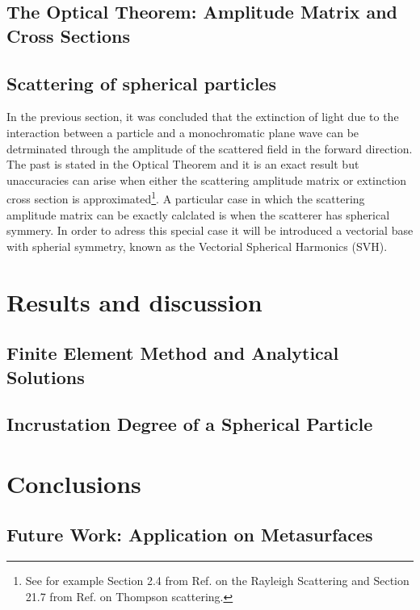 \documentclass[11pt]{Latex/Classes/PhDthesisPSnPDF}
\begin{document}
	\section{The Optical Theorem: Amplitude Matrix and Cross Sections}
	\label{section:AmpMatCrossSect}
	

	\section{Scattering of spherical particles}
	\label{section:Mie}

In the previous section, it was concluded that the extinction of light due to the interaction between a particle and a monochromatic plane wave can be detrminated through the amplitude of the scattered field in the forward direction. The past is stated in the Optical Theorem and it is an exact result but unaccuracies can arise when either the scattering amplitude matrix or extinction cross section is approximated\footnote{See for example Section 2.4 from Ref. \cite{tsang_scattering_2000} on the Rayleigh Scattering and Section 21.7 from Ref. \cite{zangwill_modern_2013} on Thompson scattering.}. A particular case in which the scattering amplitude matrix can be exactly calclated is when the scatterer has spherical symmery. In order to adress this special case it will be introduced a vectorial base with spherial symmetry, known as the Vectorial Spherical Harmonics (SVH).

	

\chapter{Results and discussion}
	\section{Finite Element Method and Analytical Solutions}
	\section{Incrustation Degree of a Spherical Particle}

\chapter{Conclusions}
    \section{Future Work: Application on Metasurfaces}
\end{document}
